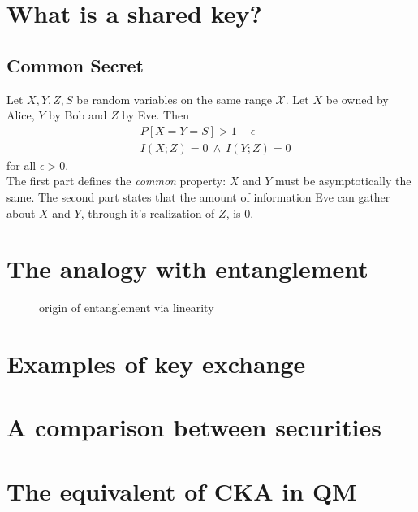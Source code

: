 \section{What is a shared key?}
    	\subsection{Common Secret} \label{commonsecret}%
	Let $X,Y,Z,S$ be random variables on the same range $\mathcal{X}$. Let $X$ be owned by Alice, $Y$ by Bob and $Z$ by Eve. Then
  \begin{align}
	 & P[X=Y=S] > 1 - \epsilon\label{eqn:common}\tag{common} \\ 
	 & I(X;Z) = 0 \: \wedge \: I(Y;Z) = 0 \label{eqn:secret}\tag{secret}
  \end{align}
for all $\epsilon > 0 $. \\
The first part defines the \textit{common} property: $X$ and $Y$ must be asymptotically the same. 
The second part states that the amount of information Eve can gather about $X$ and $Y$, through it's realization of $Z$, is $0$.
\section{The analogy with entanglement}
   	 \begin{figure}[h]
			\centering
			
			\caption{origin of entanglement via linearity}
		\end{figure}
\section{Examples of key exchange}
\section{A comparison between securities}
\section{The equivalent of CKA in QM}

